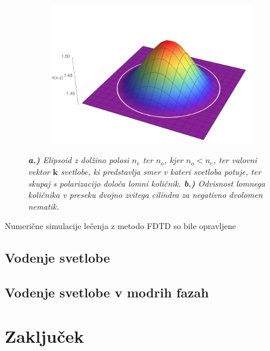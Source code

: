 \documentclass[longbibliography,slovene,a4paper,12pt]{book}
\begin{document}
\begin{figure}[h!]
\begin{subfigure}[b]{0.6\textwidth}
	\includegraphics[width=\textwidth]{slike/dtc_n_3D.png}
	\label{fig:dtcrefractiveindex3d}
	\end{subfigure}
	\caption{\emph{\textbf{a.)} Elipsoid z dolžino polosi $n_e$ ter $n_o$, kjer $n_o<n_e$, ter valovni vektor $\mathbf{k}$ svetlobe, ki predstavlja smer v kateri svetloba potuje, ter skupaj s polarizacijo določa lomni količnik. \textbf{b.)} Odvisnost lomnega količnika v preseku dvojno zvitega cilindra za negativno dvolomen nematik.}}
\end{figure}

Numerične simulacije lečenja z metodo FDTD so bile opravljene

\section{Vodenje svetlobe}

\section{Vodenje svetlobe v modrih fazah}

\chapter{Zaključek}



\cleardoublepage{}
{}

\end{document}
